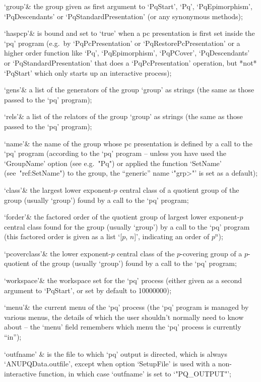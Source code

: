 \quad`group'& the group given  as  first  argument  to  `PqStart',  `Pq',
`PqEpimorphism',  `PqDescendants'  or  `PqStandardPresentation'  (or  any
synonymous methods);

\quad`haspcp'& is bound and set to `true' when a pc presentation is first
set   inside   the   `pq'   program   (e.g.~by   `PqPcPresentation'    or
`PqRestorePcPresentation'  or  a  higher  order   function   like   `Pq',
`PqEpimorphism', `PqPCover', `PqDescendants' or  `PqStandardPresentation'
that does a `PqPcPresentation' operation, but *not* `PqStart' which  only
starts up an interactive {\ANUPQ} process);

\quad`gens'& a list of the generators of the  group  `group'  as  strings
(the same as those passed to the `pq' program);

\quad`rels'& a list of the relators of the group `group' as strings  (the
same as those passed to the `pq' program);

\quad`name'& the name of the group whose pc presentation is defined by  a
call to the `pq' program (according to the `pq' program -- unless you  have
used the `GroupName' option  (see  e.g.~"Pq")  or  applied  the  function
`SetName'  (see~"ref:SetName")  to  the  group,  the   ``generic''   name
`"\<grp>"' is set as a default);

\quad`class'& the largest lower exponent-$p$ central class of a  quotient
group of the group (usually `group') found by a call to the `pq' program;

\quad`forder'& the factored order of the quotient group of largest  lower
exponent-$p$ central class found for the group  (usually  `group')  by  a
call to the `pq' program (this factored order is given as  a  list  `[$p$,
$n$]', indicating an order of $p^n$);

\quad`pcoverclass'&  the  lower  exponent-$p$  central   class   of   the
$p$-covering group of a $p$-quotient of the group (usually `group') found
by a call to the `pq' program;

\quad`workspace'& the workspace set for the `pq' process (either given as
a second argument to `PqStart', or set by default to 10000000);

\quad`menu'& the current menu of the `pq' process  (the  `pq'  program  is
managed by various  menus,  the  details  of  which  the  user  shouldn't
normally need to know about -- the `menu' field remembers which menu  the
`pq' process is currently ``in'');

\quad`outfname' & is the file to which `pq' output is directed, which  is
always `ANUPQData.outfile', except when option `SetupFile' is used with a
non-interactive  function,  in  which   case   `outfname'   is   set   to
`"PQ_OUTPUT"';

